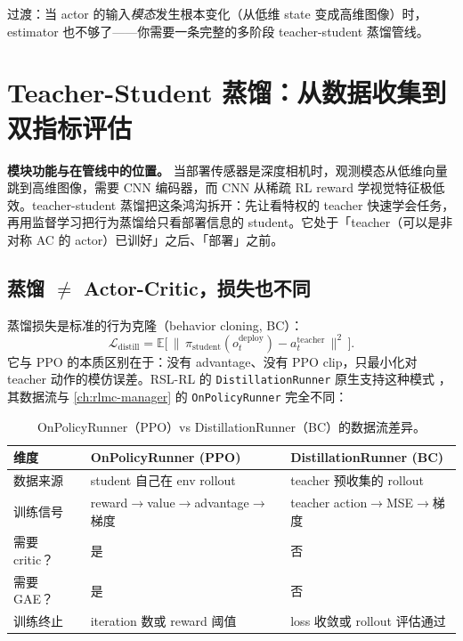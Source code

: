 过渡：当 actor 的输入\emph{模态}发生根本变化（从低维 state 变成高维图像）时，estimator 也不够了——你需要一条完整的多阶段 teacher-student 蒸馏管线。

\section{Teacher-Student 蒸馏：从数据收集到双指标评估}
\label{sec:rlmc-priv-distill}

\textbf{模块功能与在管线中的位置。} 当部署传感器是深度相机时，观测模态从低维向量跳到高维图像，需要 CNN 编码器，而 CNN 从稀疏 RL reward 学视觉特征极低效。teacher-student 蒸馏把这条鸿沟拆开：先让看特权的 teacher 快速学会任务，再用监督学习把行为蒸馏给只看部署信息的 student。它处于「teacher（可以是非对称 AC 的 actor）已训好」之后、「部署」之前。

\subsection{蒸馏 \texorpdfstring{$\ne$}{!=} Actor-Critic，损失也不同}
\label{sec:rlmc-priv-distillvsac}

蒸馏损失是标准的行为克隆（behavior cloning, BC）：
\begin{equation}
\mathcal{L}_{\text{distill}} = \mathbb{E}\Big[\,\big\lVert\, \pi_{\text{student}}(o_t^{\text{deploy}}) - a_t^{\text{teacher}}\,\big\rVert^2\,\Big].
\label{eq:rlmc-priv-distill-loss}
\end{equation}
它与 PPO 的本质区别在于：没有 advantage、没有 PPO clip，只最小化对 teacher 动作的模仿误差。RSL-RL 的 \verb|DistillationRunner| 原生支持这种模式 \cite{schwarke2025rslrl}，其数据流与 \cref{ch:rlmc-manager} 的 \verb|OnPolicyRunner| 完全不同：

\begin{table}[H]
\centering
\small
\caption{OnPolicyRunner（PPO）vs DistillationRunner（BC）的数据流差异。}
\label{tab:rlmc-priv-runners}
\begin{tabular}{@{}lll@{}}
\toprule
维度 & OnPolicyRunner (PPO) & DistillationRunner (BC) \\
\midrule
数据来源 & student 自己在 env rollout & teacher 预收集的 rollout \\
训练信号 & reward$\to$value$\to$advantage$\to$梯度 & teacher action$\to$MSE$\to$梯度 \\
需要 critic？ & 是 & 否 \\
需要 GAE？ & 是 & 否 \\
训练终止 & iteration 数或 reward 阈值 & loss 收敛或 rollout 评估通过 \\
\bottomrule
\end{tabular}
\end{table}

